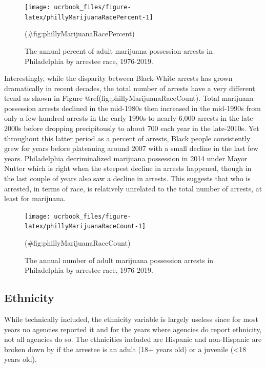 \documentclass[
  12pt,
  openany]{book}
\begin{document}
\begin{figure}

{\centering \texttt{[image: ucrbook\_files/figure-latex/phillyMarijuanaRacePercent-1]} 

}

\caption{The annual percent of adult marijuana possession arrests in Philadelphia by arrestee race, 1976-2019.}(\#fig:phillyMarijuanaRacePercent)
\end{figure}

Interestingly, while the disparity between Black-White arrests has grown dramatically in recent decades, the total number of arrests have a very different trend as shown in Figure @ref(fig:phillyMarijuanaRaceCount). Total marijuana possession arrests declined in the mid-1980s then increased in the mid-1990s from only a few hundred arrests in the early 1990s to nearly 6,000 arrests in the late-2000s before dropping precipitously to about 700 each year in the late-2010s. Yet throughout this latter period as a percent of arrests, Black people consistently grew for years before plateauing around 2007 with a small decline in the last few years. Philadelphia decriminalized marijuana possession in 2014 under Mayor Nutter which is right when the steepest decline in arrests happened, though in the last couple of years also saw a decline in arrests. This suggests that who is arrested, in terms of race, is relatively unrelated to the total number of arrests, at least for marijuana.

\begin{figure}

{\centering \texttt{[image: ucrbook\_files/figure-latex/phillyMarijuanaRaceCount-1]} 

}

\caption{The annual number of adult marijuana possession arrests in Philadelphia by arrestee race, 1976-2019.}(\#fig:phillyMarijuanaRaceCount)
\end{figure}

\hypertarget{ethnicity}{%
\subsection{Ethnicity}\label{ethnicity}}

While technically included, the ethnicity variable is largely useless since for most years no agencies reported it and for the years where agencies do report ethnicity, not all agencies do so. The ethnicities included are Hispanic and non-Hispanic are broken down by if the arrestee is an adult (18+ years old) or a juvenile (\textless18 years old).
\end{document}
